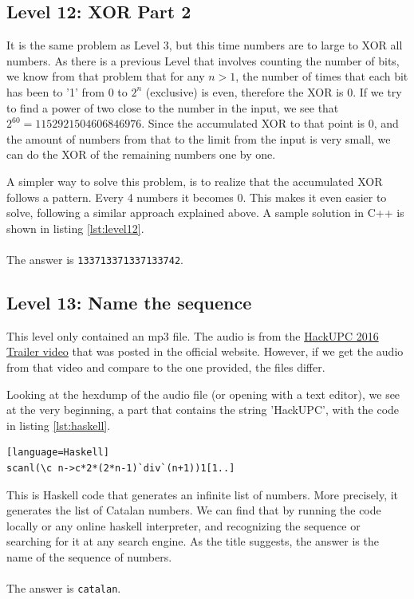 \documentclass[paper=a4, fontsize=11pt]{scrartcl}	%
\begin{document}
\subsection*{Level 12: XOR Part 2}
It is the same problem as Level 3, but this time numbers are to large to XOR all numbers. As there is a previous Level that involves counting the number of bits, we know from that problem that for any $n > 1$, the number of times that each bit has been to '1' from 0 to $2^n$ (exclusive) is even, therefore the XOR is 0. If we try to find a power of two close to the number in the input, we see that $2^{60} = 1152921504606846976$. Since the accumulated XOR to that point is 0, and the amount of numbers from that to the limit from the input is very small, we can do the XOR of the remaining numbers one by one. 

A simpler way to solve this problem, is to realize that the accumulated XOR follows a pattern. Every 4 numbers it becomes 0. This makes it even easier to solve, following a similar approach explained above. A sample solution in C++ is shown in listing \ref{lst:level12}.
\\
\\
The answer is \texttt{133713371337133742}.





\subsection*{Level 13: Name the sequence}
This level only contained an mp3 file. The audio is from the \href{https://www.youtube.com/watch?v=uAl3swU2wf4}{HackUPC 2016 Trailer video} that was posted in the official website. However, if we get the audio from that video and compare to the one provided, the files differ.

Looking at the hexdump of the audio file (or opening with a text editor), we see at the very beginning, a part that contains the string 'HackUPC', with the code in listing \ref{lst:haskell}.
\begin{lstlisting}[caption={Haskell code.},label={lst:haskell}][language=Haskell]
scanl(\c n->c*2*(2*n-1)`div`(n+1))1[1..]
\end{lstlisting}

This is Haskell code that generates an infinite list of numbers. More precisely, it generates the list of Catalan numbers. We can find that by running the code locally or any online haskell interpreter, and recognizing the sequence or searching for it at any search engine. As the title suggests, the answer is the name of the sequence of numbers.
\\
\\
The answer is \texttt{catalan}.
\end{document}
